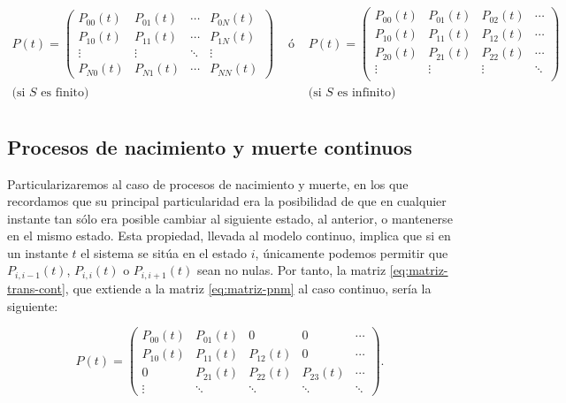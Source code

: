     \begin{equation}
        \label{eq:matriz-trans-cont}
        \begin{array}{ccc}
            P(t)=\begin{pmatrix}
                P_{00}(t) & P_{01}(t) & \cdots & P_{0N}(t) \\
                P_{10}(t) & P_{11}(t) & \cdots & P_{1N}(t) \\
                \vdots & \vdots & \ddots & \vdots \\
                P_{N0}(t) & P_{N1}(t) & \cdots & P_{NN}(t)  
            \end{pmatrix} & \text{ ó } &
            P(t)=\begin{pmatrix}
                P_{00}(t) & P_{01}(t) & P_{02}(t) & \cdots  \\
                P_{10}(t) & P_{11}(t) & P_{12}(t) & \cdots  \\
                P_{20}(t) & P_{21}(t) & P_{22}(t) & \cdots  \\
                \vdots & \vdots & \vdots & \ddots  \\ 
            \end{pmatrix} \\
            \text{(si }S\text{ es finito)} & & \text{(si }S\text{ es infinito)}\\
        \end{array}
    \end{equation}

    \subsection{Procesos de nacimiento y muerte continuos}

    Particularizaremos al caso de procesos de nacimiento y muerte, en los que recordamos que su principal particularidad era la posibilidad de que en cualquier instante tan sólo era posible cambiar al siguiente estado, al anterior, o mantenerse en el mismo estado. Esta propiedad, llevada al modelo continuo, implica que si en un instante $t$ el sistema se sitúa en el estado $i$, únicamente podemos permitir que $P_{i,i-1}(t)$, $P_{i,i}(t)$ o $P_{i,i+1}(t)$ sean no nulas. Por tanto, la matriz \eqref{eq:matriz-trans-cont}, que extiende a la matriz \eqref{eq:matriz-pnm} al caso continuo, sería la siguiente:

    \begin{equation}
        \label{eq:matriz-pnm-cont}
        P(t) = \begin{pmatrix}
            P_{00}(t) & P_{01}(t) & 0 & 0  & \cdots \\
            P_{10}(t) & P_{11}(t) & P_{12}(t) & 0  & \cdots \\

            0 & P_{21}(t) & P_{22}(t) & P_{23}(t) &  \cdots \\
            \vdots & \ddots & \ddots & \ddots & \ddots 
        \end{pmatrix}.
    \end{equation}

